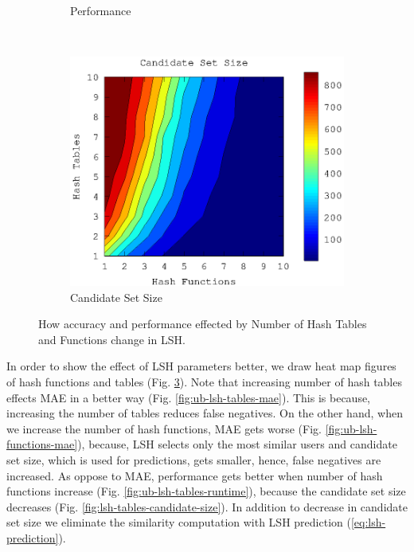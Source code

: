 \documentclass[conference]{IEEEtran}
\begin{document}
\begin{figure}
\begin{subfigure}[b]{0.225\textwidth}
                \caption{Performance}
                \label{fig:lsh-2d-runtime}
        \end{subfigure} 
        \\
         \begin{subfigure}[b]{0.225\textwidth}
                \includegraphics[width=\textwidth]{charts/candidate-set-lsh-heat-map.eps}
                \caption{Candidate Set Size}
                \label{fig:lsh-2d-candidate-size}
        \end{subfigure} 
        \caption{How accuracy and performance effected by Number of Hash Tables and Functions change in LSH.}
        \label{fig:lsh-2d}
\end{figure}

In order to show the effect of LSH parameters better, we draw heat map figures 
of hash functions and tables (Fig. \ref{fig:lsh-2d}). Note that increasing number 
of hash tables effects MAE in a better way (Fig. \ref{fig:ub-lsh-tables-mae}). 
This is because, increasing the number of tables reduces false negatives. On 
the other hand, when we increase the number of hash functions, MAE gets worse 
(Fig. \ref{fig:ub-lsh-functions-mae}), because, LSH selects only the most similar 
users and candidate set size, which is used for predictions, gets smaller, hence, 
false negatives are increased. As oppose to MAE, performance gets better when 
number of hash functions increase (Fig. \ref{fig:ub-lsh-tables-runtime}), because 
the candidate set size decreases (Fig. \ref{fig:lsh-tables-candidate-size}). 
In addition to decrease in candidate set size we eliminate the similarity 
computation with LSH prediction (\ref{eq:lsh-prediction}).
\end{document}
